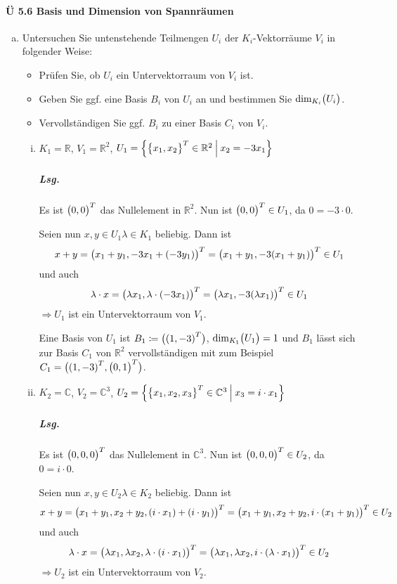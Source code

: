 \documentclass{scrreprt}
\begin{document}
\paragraph{Ü 5.6 Basis und Dimension von Spannräumen}
\begin{enumerate}[(a)]
\item Untersuchen Sie untenstehende Teilmengen $U_i$ der
  $K_i$-Vektorräume $V_i$ in folgender Weise:
  \begin{itemize}
  \item Prüfen Sie, ob $U_i$ ein Untervektorraum von $V_i$ ist.
  \item Geben Sie ggf. eine Basis $B_i$ von $U_i$ an und bestimmen Sie
    $\text{dim}_{K_i}\qty\big(U_i)$.
  \item Vervollständigen Sie ggf. $B_i$ zu einer Basis $C_i$ von $V_i$.
  \end{itemize}

  \begin{enumerate}[(i)]
  \item $K_1 = \mathbb{R}$, $V_1 = \mathbb{R}^2$,
    $U_1 = \qty{\qty\big{x_1, x_2}^T \in \mathbb{R}^2 \:\middle|\: x_2 = -3x_1}$

    \subparagraph{Lsg.} Es ist $\qty\big(0, 0)^T$ das Nullelement in
    $\mathbb{R}^2$.
    Nun ist $\qty\big(0, 0)^T \in U_1$, da $0 = -3 \cdot 0$.

    Seien nun $x, y \in U_1 \lambda \in K_1$ beliebig.
    Dann ist
    \[
      x + y = \qty\big(x_1 + y_1, -3x_1 + \qty(-3y_1))^T
      = \qty\big(x_1 + y_1, -3\qty(x_1 + y_1))^T \in U_1
    \]
    und auch
    \[
      \lambda \cdot x = \qty\big(\lambda x_1, \lambda \cdot \qty(-3x_1))^T
      = \qty\big(\lambda x_1, -3 \qty(\lambda x_1))^T \in U_1
    \]
    $\Rightarrow U_1$ ist ein Untervektorraum von $V_1$.

    Eine Basis von $U_1$ ist $B_1 \coloneqq \qty\big(\qty(1, -3)^T)$,
    $\text{dim}_{K_1}\qty\big(U_1) = 1$ und
    $B_1$ lässt sich zur Basis $C_1$ von $\mathbb{R}^2$ vervollständigen mit
    zum Beispiel $C_1 = \qty\big(\qty(1, -3)^T, \qty\big(0, 1)^T)$.

  \newpage
  \item $K_2 = \mathbb{C}$, $V_2 = \mathbb{C}^3$,
    $U_2 = \qty{\qty\big{x_1, x_2, x_3}^T \in \mathbb{C}^3 \:\middle|\: x_3 = i \cdot x_1}$

    \subparagraph{Lsg.} Es ist $\qty\big(0, 0, 0)^T$ das Nullelement in
    $\mathbb{C}^3$.
    Nun ist $\qty\big(0, 0, 0)^T \in U_2$, da $0 = i \cdot 0$.

    Seien nun $x, y \in U_2 \lambda \in K_2$ beliebig.
    Dann ist
    \[
      x + y = \qty\big(x_1 + y_1, x_2 + y_2, \qty(i \cdot x_1) + \qty(i \cdot y_1))^T
      = \qty\big(x_1 + y_1, x_2 + y_2, i \cdot \qty(x_1 + y_1))^T \in U_2
    \]
    und auch
    \[
      \lambda \cdot x = \qty\big(\lambda x_1, \lambda x_2, \lambda \cdot \qty(i \cdot x_1))^T
      = \qty\big(\lambda x_1, \lambda x_2, i \cdot \qty(\lambda \cdot x_1))^T \in U_2
    \]
    $\Rightarrow U_2$ ist ein Untervektorraum von $V_2$.


\end{enumerate}
\end{enumerate}
\end{document}

